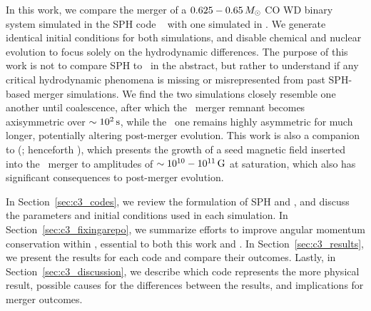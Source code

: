 In this work, we compare the merger of a $0.625 - 0.65\,\Msun$ CO WD binary system simulated in the SPH code \gasoline\ \citep{wadssq04} with one simulated in \arepo.  We generate identical initial conditions for both simulations, and disable chemical and nuclear evolution to focus solely on the hydrodynamic differences.  The purpose of this work is not to compare SPH to \arepo\ in the abstract, but rather to understand if any critical hydrodynamic phenomena is missing or misrepresented from past SPH-based merger simulations.  We find the two simulations closely resemble one another until coalescence, after which the \gasoline\ merger remnant becomes axisymmetric over $\sim10^2\,\mathrm{s}$, while the \arepo\ one remains highly asymmetric for much longer, potentially altering post-merger evolution.  This work is also a companion to \citeauthor{zhu+15} (\citeyear{zhu+15}; henceforth \citeal{zhu+15}), which presents the growth of a seed magnetic field inserted into the \arepo\ merger to amplitudes of $\sim10^{10}-10^{11}\,\mathrm{G}$ at saturation, which also has significant consequences to post-merger evolution.

In Section~\ref{sec:c3_codes}, we review the formulation of SPH and \arepo, and discuss the parameters and initial conditions used in each simulation.  In Section~\ref{sec:c3_fixingarepo}, we summarize efforts to improve angular momentum conservation within \arepo, essential to both this work and \citeal{zhu+15}.  In Section~\ref{sec:c3_results}, we present the results for each code and compare their outcomes.  Lastly, in Section~\ref{sec:c3_discussion}, we describe which code represents the more physical result, possible causes for the differences between the results, and implications for merger outcomes.
